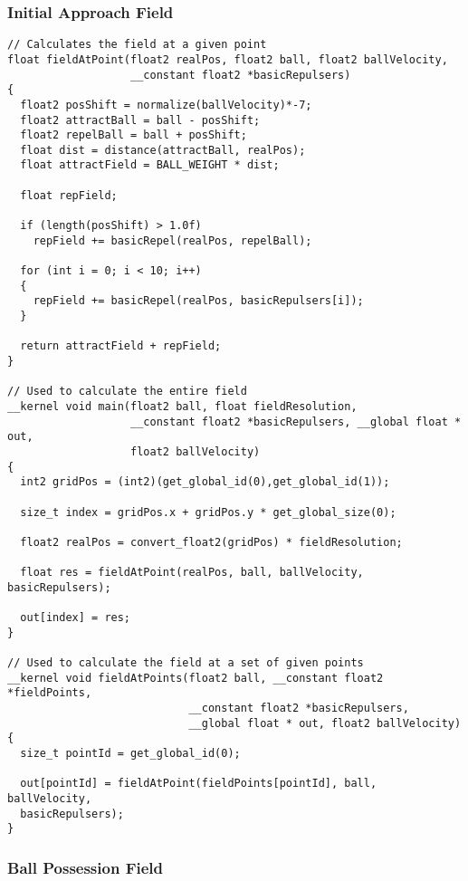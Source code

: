 \subsubsection{Initial Approach Field\label{app:initialApproachField}}

\begin{lstlisting}
// Calculates the field at a given point
float fieldAtPoint(float2 realPos, float2 ball, float2 ballVelocity, 
                   __constant float2 *basicRepulsers)
{
  float2 posShift = normalize(ballVelocity)*-7;
  float2 attractBall = ball - posShift;
  float2 repelBall = ball + posShift;
  float dist = distance(attractBall, realPos);
  float attractField = BALL_WEIGHT * dist;

  float repField;

  if (length(posShift) > 1.0f)
    repField += basicRepel(realPos, repelBall);

  for (int i = 0; i < 10; i++)
  {
    repField += basicRepel(realPos, basicRepulsers[i]);
  }

  return attractField + repField;
}

// Used to calculate the entire field
__kernel void main(float2 ball, float fieldResolution, 
                   __constant float2 *basicRepulsers, __global float * out,
                   float2 ballVelocity) 
{
  int2 gridPos = (int2)(get_global_id(0),get_global_id(1));

  size_t index = gridPos.x + gridPos.y * get_global_size(0);

  float2 realPos = convert_float2(gridPos) * fieldResolution;

  float res = fieldAtPoint(realPos, ball, ballVelocity, basicRepulsers);

  out[index] = res;
}

// Used to calculate the field at a set of given points
__kernel void fieldAtPoints(float2 ball, __constant float2 *fieldPoints, 
                            __constant float2 *basicRepulsers, 
                            __global float * out, float2 ballVelocity) 
{
  size_t pointId = get_global_id(0);

  out[pointId] = fieldAtPoint(fieldPoints[pointId], ball, ballVelocity,
  basicRepulsers); 
}
\end{lstlisting}

\subsubsection{Ball Possession Field \label{app:possessionField}}

